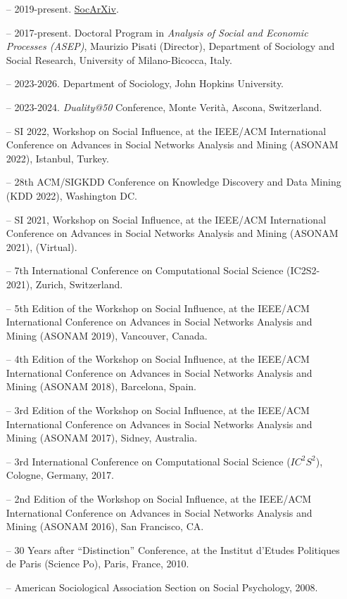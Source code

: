 \begin{itemize}[itemsep=-0.5ex]
    \item[--] 2019-present. \href{https://socopen.org/}{SocArXiv}.
    \item[--] 2017-present. Doctoral Program in {\em Analysis of Social and Economic Processes (ASEP)}, Maurizio Pisati (Director), Department of Sociology and Social Research, University of Milano-Bicocca, Italy. 
\end{itemize}

\begin{itemize}[itemsep=-0.5ex]
    \item[--] 2023-2026. Department of Sociology, John Hopkins University.
    \item[--] 2023-2024. \textit{Duality@50} Conference, Monte Verit\`{a}, Ascona, Switzerland.
\end{itemize}

\begin{itemize}[itemsep=-0.5ex]
    \item[--] SI 2022, Workshop on Social Influence, at the IEEE/ACM International Conference on Advances in Social Networks Analysis and Mining (ASONAM 2022), Istanbul, Turkey.
    \item[--] 28th ACM/SIGKDD Conference on Knowledge Discovery and Data Mining (KDD 2022), Washington DC.
    \item[--] SI 2021, Workshop on Social Influence, at the IEEE/ACM International Conference on Advances in Social Networks Analysis and Mining (ASONAM 2021), (Virtual).
    \item[--] 7th International Conference on Computational Social Science (IC2S2-2021), Zurich, Switzerland.
    \item[--] 5th Edition of the Workshop on Social Influence, at the IEEE/ACM International Conference on Advances in Social Networks Analysis and Mining (ASONAM 2019), Vancouver, Canada. 
    \item[--] 4th Edition of the Workshop on Social Influence, at the IEEE/ACM International Conference on Advances in Social Networks Analysis and Mining (ASONAM 2018), Barcelona, Spain. 
    \item[--] 3rd Edition of the Workshop on Social Influence, at the IEEE/ACM International Conference on Advances in Social Networks Analysis and Mining (ASONAM 2017), Sidney, Australia. 
    \item[--] 3rd International Conference on Computational Social Science ($IC^2S^2$), Cologne, Germany, 2017. 
    \item[--] 2nd Edition of the Workshop on Social Influence, at the IEEE/ACM International Conference on Advances in Social Networks Analysis and Mining (ASONAM 2016), San Francisco, CA. 
    \item[--] 30 Years after ``Distinction'' Conference, at the Institut d'Etudes Politiques de Paris (Science Po), Paris, France, 2010.
    \item[--] American Sociological Association Section on Social Psychology, 2008.
\end{itemize}